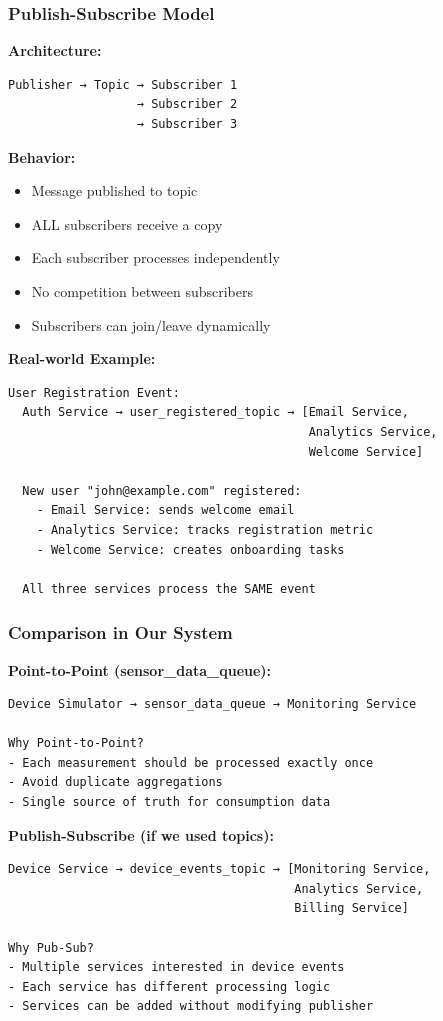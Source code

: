 \documentclass[12pt,a4paper]{article}
\begin{document}
\subsubsection{Publish-Subscribe Model}

\textbf{Architecture:}
\begin{verbatim}
Publisher → Topic → Subscriber 1
                  → Subscriber 2
                  → Subscriber 3
\end{verbatim}

\textbf{Behavior:}
\begin{itemize}
    \item Message published to topic
    \item ALL subscribers receive a copy
    \item Each subscriber processes independently
    \item No competition between subscribers
    \item Subscribers can join/leave dynamically
\end{itemize}

\textbf{Real-world Example:}
\begin{verbatim}
User Registration Event:
  Auth Service → user_registered_topic → [Email Service,
                                          Analytics Service,
                                          Welcome Service]
  
  New user "john@example.com" registered:
    - Email Service: sends welcome email
    - Analytics Service: tracks registration metric
    - Welcome Service: creates onboarding tasks
  
  All three services process the SAME event
\end{verbatim}


\subsubsection{Comparison in Our System}

\textbf{Point-to-Point (sensor\_data\_queue):}
\begin{verbatim}
Device Simulator → sensor_data_queue → Monitoring Service

Why Point-to-Point?
- Each measurement should be processed exactly once
- Avoid duplicate aggregations
- Single source of truth for consumption data
\end{verbatim}

\textbf{Publish-Subscribe (if we used topics):}
\begin{verbatim}
Device Service → device_events_topic → [Monitoring Service,
                                        Analytics Service,
                                        Billing Service]

Why Pub-Sub?
- Multiple services interested in device events
- Each service has different processing logic
- Services can be added without modifying publisher
\end{verbatim}
\end{document}
